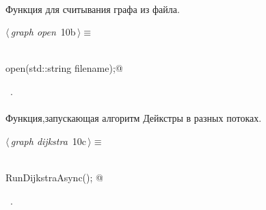 \documentclass[12pt]{article}
\begin{document}
\paragraph{}
Функция для считывания графа из файла.

\begin{flushleft} \small
\begin{minipage}{\linewidth}\label{scrap10}\raggedright\small
{} $\langle\,${\itshape graph open}\nobreak\ {\footnotesize {10b}}$\,\rangle\equiv$
\vspace{-1ex}
\begin{list}{}{} \item
\mbox{}\verb@@\\
\mbox{}\verb@void open(std::string filename);@\\
\mbox{}\verb@@{\NWsep}
\end{list}
\vspace{-1.5ex}
\footnotesize
\begin{list}{}{\setlength{\itemsep}{-\parsep}\setlength{\itemindent}{-\leftmargin}}
\item \NWtxtMacroRefIn\ .

\item{}
\end{list}
\end{minipage}\vspace{4ex}
\end{flushleft}
\paragraph{}
Функция,запускающая алгоритм Дейкстры в разных потоках.
\begin{flushleft} \small
\begin{minipage}{\linewidth}\label{scrap11}\raggedright\small
{} $\langle\,${\itshape graph dijkstra}\nobreak\ {\footnotesize {10c}}$\,\rangle\equiv$
\vspace{-1ex}
\begin{list}{}{} \item
\mbox{}\verb@@\\
\mbox{}\verb@double RunDijkstraAsync();    @\\
\mbox{}\verb@@{\NWsep}
\end{list}
\vspace{-1.5ex}
\footnotesize
\begin{list}{}{\setlength{\itemsep}{-\parsep}\setlength{\itemindent}{-\leftmargin}}
\item \NWtxtMacroRefIn\ .

\item{}
\end{list}
\end{minipage}\vspace{4ex}
\end{flushleft}
\end{document}
